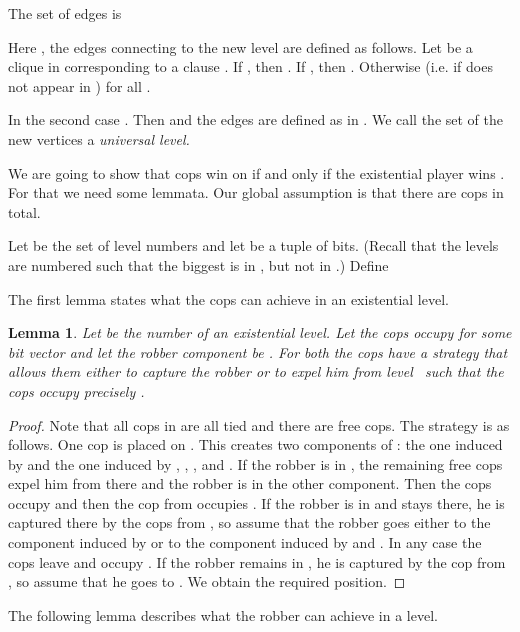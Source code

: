 \documentclass[authoryear]{article}
\makeatletter
\newtheorem{lemma}[theorem]{Lemma}
\theoremstyle{definition}
\newcommand{\0}{\emptyset}
\newcommand{\ie}{i.e.\@\xspace}
\makeatother
\begin{document}
The set of edges is

Here , the edges connecting  to the new level are
defined as follows. Let  be a
clique in  corresponding to a clause . If , then . If , then . Otherwise (\ie if  does not
appear in )  for all .

In the second case . Then  and the edges are defined as in 
. We call the set of the new vertices a \emph{universal level.} 

We are going to show that  cops win on  if and only if the 
existential player wins . For that we need some 
lemmata. Our global assumption is that there are  cops in total.

Let  be the
set of level numbers and let  be a tuple of
bits. (Recall that the levels are numbered such that the biggest is in
, but not in .) Define





The first lemma states what the cops can achieve in an existential level.

\begin{lemma}\label{lemma:cops_invariant}
  Let  be the number of an existential level.  Let the cops occupy
   for some bit vector  and let the robber component be
  .  For both  the cops have a strategy that allows
  them either to capture the robber or to expel him from level~ such that
  the cops occupy precisely .
\end{lemma}
\begin{proof}
  Note that all cops in  are all tied and there are  free
  cops.  The strategy is as follows. One cop is placed on . This
  creates two components of : the one induced by  and
  the one induced by , , ,  and
  . If the robber is in , the remaining free cops
  expel him from there and the robber is in the other component. Then the cops
  occupy  and then the cop from  occupies
  . If the robber is in  and stays there, he is captured
  there by the cops from , so assume that the robber goes either to the
  component induced by  or to the component induced by 
  and . In any case the cops leave  and occupy
  . If the robber remains in , he is captured by the cop
  from , so assume that he goes to . We obtain the
  required position.
\end{proof}

The following lemma describes what the robber can achieve in a level.
\end{document}

